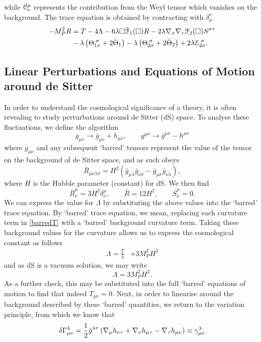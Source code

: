 while ${\cal C}_{\nu}^{\mu}$ represents the contribution from the Weyl tensor which vanishes on the background. The trace equation is obtained by contracting with $\delta_{\mu}^{\nu}$
 \[
 \label{barredT}
\begin{aligned}-M_{P}^{2}R & =T-4\Lambda-6\lambda\Box\tilde{{\cal F}}_{1}(\Box)R-2\lambda\nabla_{\sigma}\nabla_{\tau}{\cal F}_{2}(\Box)S^{\sigma\tau}\\
 & -\lambda\left(\Theta_{1\sigma}^{\;\sigma}+2\bar{\Theta}_{1}\right)-\lambda\left(\Theta_{2\sigma}^{\;\sigma}+2\bar{\Theta}_{2}\right)+2\lambda{\cal E}_{2\sigma}^{\;\sigma}.
\end{aligned}
\]
\subsection*{Linear Perturbations and Equations of Motion around de Sitter} 
\label{sec:pertds}
In order to understand the cosmological significance of a theory, it is often revealing to study perturbations around de Sitter (dS) space. To analyse these fluctuations, we define the algorithm
\[
g_{\mu\nu}\rightarrow\bar{g}_{\mu\nu}+h_{\mu\nu},\qquad g^{\mu\nu}\rightarrow\bar{g}^{\mu\nu}-h^{\mu\nu}
 \]
where $\bar{g}_{\mu\nu}$
  and any subsequent `barred' tensors represent the value of the tensor on the background of de Sitter space, and as such obeys
\[
\bar{R}_{\mu\nu\lambda\sigma}=H^{2}(\bar{g}_{\mu\lambda}\bar{g}_{\nu\sigma}-\bar{g}_{\mu\sigma}\bar{g}_{\nu\lambda}),
  \]
where $H$ is the Hubble parameter (constant) for dS. We then find
\[
\label{barredR}
\bar{R}_{\nu}^{\mu}=3H^{2}\delta_{\nu}^{\mu},\qquad\bar{R}=12H^{2},\qquad\bar{S}_{\nu}^{\mu}=0.
 \]
We can express the value for $\Lambda$ by substituting the above values into the `barred' trace equation. By `barred' trace equation, we mean, replacing each curvature term in \eqref{barredT} with a `barred' background curvature term. Taking these background values for the curvature  allows us to express the cosmological constant as follows
\[
\begin{aligned}\Lambda=\frac{T}{4} & +3M_{P}^{2}H^{2}\end{aligned}
 \]
and as dS is a vacuum solution, we may write
\[
\label{barredlambda}
\Lambda=3M_P^2 H^2.
 \]
As a further check, this may be substituted into the full `barred' equations of motion to find that indeed $T_{\mu\nu}=0$.   
Next, in order to linearise around the background described by these `barred' quantities, we return to the variation principle, from which we know that
\[
\delta\Gamma_{\mu\nu}^{\lambda}=\frac{1}{2}\bar{g}^{\lambda\tau}\left(\nabla_{\mu}h_{\nu\tau}+\nabla_{\nu}h_{\mu\tau}-\nabla_{\tau}h_{\mu\nu}\right)\equiv\gamma_{\mu\nu}^{\lambda}
\nonumber
\]
